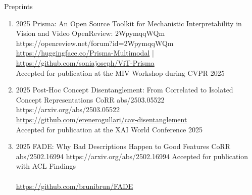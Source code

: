 \headedsubsection %
{Preprints}{}
{
    \begin{enumerate}


        \item {}
                        {2025}
                        {Prisma: An Open Source Toolkit for Mechanistic Interpretability in Vision and Video}
                        {OpenReview: 2WpymqqWQm}
                        {https://openreview.net/forum?id=2WpymqqWQm}
                        {
                            \\\href{https://huggingface.co/Prisma-Multimodal}{https://huggingface.co/Prisma-Multimodal} | \href{https://github.com/soniajoseph/ViT-Prisma}{https://github.com/soniajoseph/ViT-Prisma}
                            \\ Accepted for publication at the MIV Workshop during CVPR 2025
                        }



        \item {}
                        {2025}
                        {Post-Hoc Concept Disentanglement: From Correlated to Isolated Concept Representations}
                        {CoRR abs/2503.05522}
                        {https://arxiv.org/abs/2503.05522}
                        {
                            \\\href{https://github.com/erenerogullari/cav-disentanglement}{https://github.com/erenerogullari/cav-disentanglement}
                            \\ Accepted for publication at the XAI World Conference 2025
                        }
        
        \item {}
                        {2025}
                        {FADE: Why Bad Descriptions Happen to Good Features}
                        {CoRR abs/2502.16994}
                        {https://arxiv.org/abs/2502.16994}
                        {
                            Accepted for publication with ACL Findings \\
                            \\\href{https://github.com/brunibrun/FADE}{https://github.com/brunibrun/FADE}
                        }
                        

\end{enumerate}}
